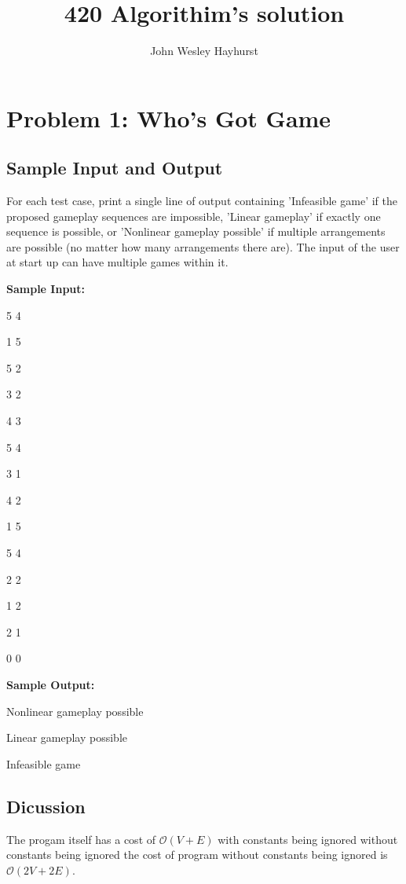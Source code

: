 \documentclass[11pt]{article}
\begin{document}
  \title{420 Algorithim's solution}
  \author{John Wesley Hayhurst}
  \maketitle
\section{Problem 1: Who's Got Game}

\subsection{Sample Input and Output}
For each test case, print a single line of output containing 'Infeasible game' if the proposed gameplay sequences are impossible, 'Linear gameplay' if exactly one sequence is possible, or 'Nonlinear gameplay possible' if multiple arrangements are possible (no matter how many arrangements there are).
The input of the user at start up can have multiple games within it.
\begin{flushleft}

\textbf{Sample Input:}
\vspace{2mm}
\par
5 4
  
1 5
  
5 2
  
3 2
  
4 3
  
5 4
  
3 1
  
4 2
  
1 5 
  
5 4
  
2 2
  
1 2
  
2 1
  
0 0
\vspace{2mm}
\par
\textbf{Sample Output:}
\vspace{2mm}
\par
Nonlinear gameplay possible

Linear gameplay possible

Infeasible game 
\end{flushleft}
\subsection{Dicussion}
The progam itself has a cost of $\mathcal{O}(V + E)$ with constants being ignored without constants being ignored the cost of program without constants being ignored is $\mathcal{O}(2V+2E)$.
\end{document}
